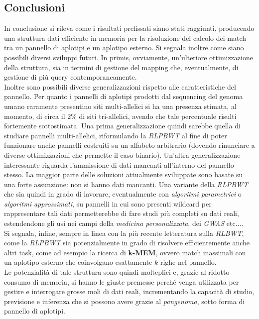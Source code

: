 \documentclass[a4paper,11pt, oneside]{article}
\begin{document}
\subsection*{Conclusioni}
In conclusione si rileva come i risultati prefissati siano stati raggiunti,
producendo una struttura dati efficiente in memoria per la risoluzione del
calcolo dei match tra un pannello di aplotipi e un aplotipo esterno. 
Si segnala inoltre come siano possibili diversi sviluppi futuri. In primis,
ovviamente, un'ulteriore ottimizzazione della struttura, sia in termini
di gestione del mapping che, eventualmente, di gestione di più query
contemporaneamente. \\
Inoltre sono possibili diverse generalizzazioni rispetto alle caratteristiche
del pannello. Per quanto i pannelli di aplotipi prodotti dal sequencing del
genoma umano raramente presentino siti multi-allelici si ha una 
presenza stimata, al momento, di circa il 2\% di siti tri-allelici, avendo che
tale percentuale risulti fortemente sottostimata. Una prima generalizzazione
quindi sarebbe quella di studiare pannelli multi-allelici, riformulando la
\textit{RLPBWT} al fine di poter funzionare anche pannelli costruiti su un
alfabeto arbitrario (dovendo rinunciare a diverse ottimizzazioni che permette il
caso binario). Un'altra generalizzazione interessante riguarda l'ammissione di
dati mancanti all'interno del pannello stesso. La maggior parte delle soluzioni
attualmente sviluppate sono basate su una forte assunzione: non si hanno dati
mancanti. Una variante della \textit{RLPBWT} che sia quindi in grado di
lavorare, eventualmente con \textit{algoritmi parametrici} o \textit{algoritmi
  approssimati}, 
su pannelli in cui sono presenti wildcard per rappresentare tali dati
permetterebbe di fare studi più completi su dati reali, estendendone gli usi nei
campi della \textit{medicina personalizzata}, dei \textit{GWAS} etc$\ldots$.\\ 
Si segnala, infine, sempre in linea con la più recente letteratura sulla
\textit{RLBWT}, come la \textit{RLPBWT} sia potenzialmente in grado di risolvere
efficientemente anche altri task, come ad esempio la ricerca di \textbf{k-MEM},
ovvero match massimali con un aplotipo esterno che coinvolgano esattamente $k$
righe nel pannello. \\
Le potenzialità di tale struttura sono quindi molteplici e, grazie al ridotto
consumo di memoria, si hanno le giuste premesse perché venga utilizzata per
gestire e interrogare grosse moli di dati reali, incrementando la capacità di
studio, previsione e inferenza che si possono avere grazie al
\textit{pangenoma}, sotto forma di pannello di aplotipi.
\end{document}

